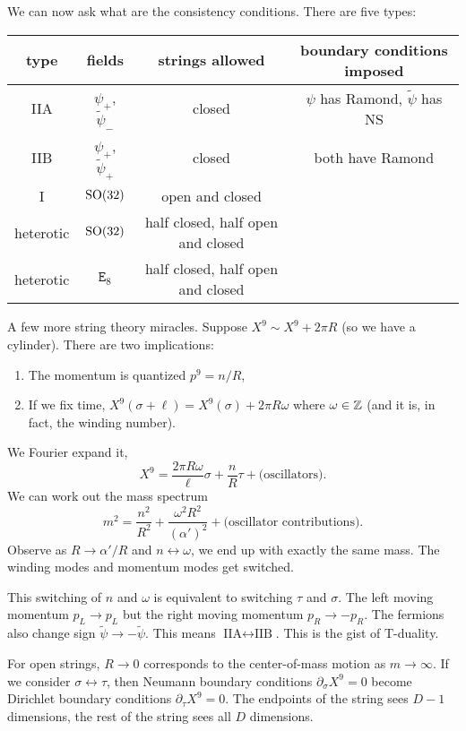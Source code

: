 We can now ask what are the consistency conditions. There are five
types:
\begin{center}\let\oldarraystretch\arraystretch\renewcommand{\arraystretch}{1.5}
  \begin{tabular}{cccc}
    type & fields & strings allowed & boundary conditions imposed\\\hline
IIA & $\psi_{+}$, $\widetilde{\psi}_{-}$ & closed & $\psi$ has Ramond, $\widetilde{\psi}$ has NS\\
IIB & $\psi_{+}$, $\widetilde{\psi}_{+}$ & closed & both have Ramond\\
I & $\operatorname{SO}(32)$ & open and closed & \\
heterotic & $\operatorname{SO}(32)$ & half closed, half open and closed & \\
heterotic & $\mathtt{E}_{8}$ & half closed, half open and closed &
\end{tabular}\renewcommand{\arraystretch}{\oldarraystretch}
\end{center}
A few more string theory miracles. Suppose $X^{9}\sim X^{9}+2\pi R$ (so
we have a cylinder). There are two implications:
\begin{enumerate}
\item The momentum is quantized $p^{9}=n/R$,
\item If we fix time, $X^{9}(\sigma+\ell)=X^{9}(\sigma) + 2\pi R\omega$
  where $\omega\in\mathbb{Z}$ (and it is, in fact, the winding number).
\end{enumerate}
We Fourier expand it,
\begin{equation}
X^{9} = \frac{2\pi R\omega}{\ell}\sigma + \frac{n}{R}\tau + \mbox{(oscillators)}.
\end{equation}
We can work out the mass spectrum
\begin{equation}
m^{2} = \frac{n^{2}}{R^{2}} + \frac{\omega^{2}R^{2}}{(\alpha')^{2}} +
\mbox{(oscillator contributions)}.
\end{equation}
Observe as $R\to\alpha'/R$ and $n\leftrightarrow\omega$, we end up with
exactly the same mass. The winding modes and momentum modes get switched.

This switching of $n$ and $\omega$ is equivalent to switching $\tau$ and
$\sigma$. The left moving momentum $p_{L}\to p_{L}$ but the right moving
momentum $p_{R}\to -p_{R}$. The fermions also change sign
$\widetilde{\psi}\to-\widetilde{\psi}$. This means
$\mbox{IIA}\leftrightarrow\mbox{IIB}$. This is the gist of T-duality.

For open strings, $R\to0$ corresponds to the center-of-mass motion as
$m\to\infty$. If we consider $\sigma\leftrightarrow\tau$, then Neumann
boundary conditions $\partial_{\sigma}X^{9}=0$ become Dirichlet boundary
conditions $\partial_{\tau}X^{9}=0$. The endpoints of the string sees
$D-1$ dimensions, the rest of the string sees all $D$ dimensions.
